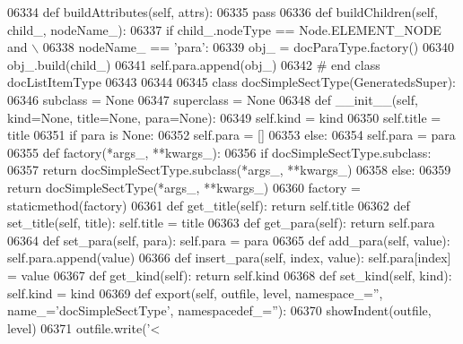 \begin{DoxyCode}
{{{{{{{{{{{{{{{{{{{{{{{{{{{{{{{{{{{{{{{{{{{{{{{{{{{{{{{{{{{{{{{{{{{{{{{{{{{{{{{{{{{{{{{{{{{{{{{{{{{{{{{{{{{{{{{{{{{{{{{{{{{{{{{{{{{{{{{{{{{{{{{{{{{{{{{{{{{{{{{{{{{{{{{{{{{{{{{{{{{{{{{{{{{{{{{{{{{{{{{{{{{{{{{{{{{{{{{{{{{{{{{{{{{{{{{{{{{{{{{{{{{{{{{{{{{{{{{{{{{{{{{{{{{{{{{{{{{{{{{{{{{{{{{{{{{{{{{{{{{{{{{{{{{{{{{{{{{{{{{{{{{{{{{{{{{{{{{{{{{{{{{{{{{{{{{{{{{{{{{{{{{{{{{{{{{{{{{{{{{{{{{{{{{{{{{{06334     \textcolor{keyword}{def }buildAttributes(self, attrs):
06335         \textcolor{keywordflow}{pass}
06336     \textcolor{keyword}{def }buildChildren(self, child\_, nodeName\_):
06337         \textcolor{keywordflow}{if} child\_.nodeType == Node.ELEMENT\_NODE \textcolor{keywordflow}{and} \(\backslash\)
06338             nodeName\_ == \textcolor{stringliteral}{'para'}:
06339             obj\_ = docParaType.factory()
06340             obj\_.build(child\_)
06341             self.para.append(obj\_)
06342 \textcolor{comment}{# end class docListItemType}
06343 
06344 
06345 \textcolor{keyword}{class }docSimpleSectType(GeneratedsSuper):
06346     subclass = \textcolor{keywordtype}{None}
06347     superclass = \textcolor{keywordtype}{None}
06348     \textcolor{keyword}{def }__init__(self, kind=None, title=None, para=None):
06349         self.kind = kind
06350         self.title = title
06351         \textcolor{keywordflow}{if} para \textcolor{keywordflow}{is} \textcolor{keywordtype}{None}:
06352             self.para = []
06353         \textcolor{keywordflow}{else}:
06354             self.para = para
06355     \textcolor{keyword}{def }factory(*args\_, **kwargs\_):
06356         \textcolor{keywordflow}{if} docSimpleSectType.subclass:
06357             \textcolor{keywordflow}{return} docSimpleSectType.subclass(*args\_, **kwargs\_)
06358         \textcolor{keywordflow}{else}:
06359             \textcolor{keywordflow}{return} docSimpleSectType(*args\_, **kwargs\_)
06360     factory = staticmethod(factory)
06361     \textcolor{keyword}{def }get_title(self): \textcolor{keywordflow}{return} self.title
06362     \textcolor{keyword}{def }set_title(self, title): self.title = title
06363     \textcolor{keyword}{def }get_para(self): \textcolor{keywordflow}{return} self.para
06364     \textcolor{keyword}{def }set_para(self, para): self.para = para
06365     \textcolor{keyword}{def }add_para(self, value): self.para.append(value)
06366     \textcolor{keyword}{def }insert_para(self, index, value): self.para[index] = value
06367     \textcolor{keyword}{def }get_kind(self): \textcolor{keywordflow}{return} self.kind
06368     \textcolor{keyword}{def }set_kind(self, kind): self.kind = kind
06369     \textcolor{keyword}{def }export(self, outfile, level, namespace\_='', name\_='docSimpleSectType', namespacedef\_=''):
06370         showIndent(outfile, level)
06371         outfile.write(\textcolor{stringliteral}{'<%
}}}}}}}}}}}}}}}}}}}}}}}}}}}}}}}}}}}}}}}}}}}}}}}}}}}}}}}}}}}}}}}}}}}}}}}}}}}}}}}}}}}}}}}}}}}}}}}}}}}}}}}}}}}}}}}}}}}}}}}}}}}}}}}}}}}}}}}}}}}}}}}}}}}}}}}}}}}}}}}}}}}}}}}}}}}}}}}}}}}}}}}}}}}}}}}}}}}}}}}}}}}}}}}}}}}}}}}}}}}}}}}}}}}}}}}}}}}}}}}}}}}}}}}}}}}}}}}}}}}}}}}}}}}}}}}}}}}}}}}}}}}}}}}}}}}}}}}}}}}}}}}}}}}}}}}}}}}}}}}}}}}}}}}}}}}}}}}}}}}}}}}}}}}}}}}}}}}}}}}}}}}}}}}}}}}}}}}}}}}}}}}}}}}}}}}}}
\end{DoxyCode}
